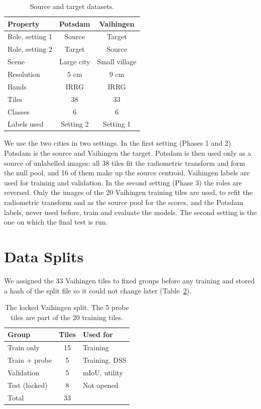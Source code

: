 \documentclass[11pt,a4paper]{report}
\begin{document}
\begin{table}[t]
\centering
\caption{Source and target datasets.}
\label{tab:datasets}
\small
\begin{tabular}{@{}lcc@{}}
\toprule
\textbf{Property} & \textbf{Potsdam} & \textbf{Vaihingen} \\
\midrule
Role, setting 1 & Source & Target \\
Role, setting 2 & Target & Source \\
Scene & Large city & Small village \\
Resolution & 5 cm & 9 cm \\
Bands & IRRG & IRRG \\
Tiles & 38 & 33 \\
Classes & 6 & 6 \\
Labels used & Setting 2 & Setting 1 \\
\bottomrule
\end{tabular}
\end{table}

We use the two cities in two settings. In the first setting (Phases 1 and 2) Potsdam is the source and Vaihingen the target. Potsdam is then used only as a source of unlabelled images: all 38 tiles fit the radiometric transform and form the null pool, and 16 of them make up the source centroid. Vaihingen labels are used for training and validation. In the second setting (Phase 3) the roles are reversed. Only the images of the 20 Vaihingen training tiles are used, to refit the radiometric transform and as the source pool for the scores, and the Potsdam labels, never used before, train and evaluate the models. The second setting is the one on which the final test is run.

\section{Data Splits}

We assigned the 33 Vaihingen tiles to fixed groups before any training and stored a hash of the split file so it could not change later (Table~\ref{tab:split}).

\begin{table}[t]
\centering
\caption{The locked Vaihingen split. The 5 probe tiles are part of the 20 training tiles.}
\label{tab:split}
\small
\begin{tabular}{@{}lcl@{}}
\toprule
\textbf{Group} & \textbf{Tiles} & \textbf{Used for} \\
\midrule
Train only & 15 & Training \\
Train + probe & 5 & Training, DSS \\
Validation & 5 & mIoU, utility \\
Test (locked) & 8 & Not opened \\
\midrule
Total & 33 & \\
\bottomrule
\end{tabular}
\end{table}
\end{document}
